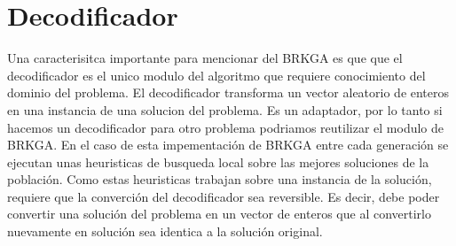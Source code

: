 \section{Decodificador}

Una caracterisitca importante para mencionar del BRKGA es que que el decodificador es el unico modulo del algoritmo que requiere conocimiento del dominio del problema. El decodificador transforma un vector aleatorio de enteros en una instancia de una solucion del problema. Es un adaptador, por lo tanto si hacemos un decodificador para otro problema podriamos reutilizar el modulo de BRKGA.
En el caso de esta impementación de BRKGA entre cada generación se ejecutan unas heuristicas de busqueda local sobre las mejores soluciones de la población. Como estas heuristicas trabajan sobre una instancia de la solución, requiere que la converción del decodificador sea reversible. Es decir, debe poder convertir una solución del problema en un vector de enteros que al convertirlo nuevamente en solución sea identica a la solución original. 

